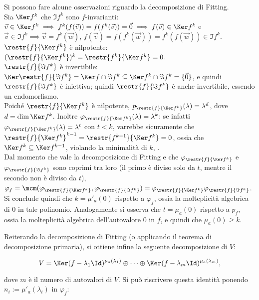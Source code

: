 \documentclass[11pt]{article}
\begin{document}
	\begin{remark} Si possono fare alcune osservazioni riguardo la decomposizione di Fitting. \\

	\li Sia $\Ker f^k$ che $\Im f^k$ sono $f$-invarianti: $\vec v \in \Ker f^k \implies f^k(f(\vec v)) = f(f^k(\vec v)) = \vec0 \implies f(\vec v) \in \Ker f^k$ e $\vec v \in \Im f^k \implies \vec v = f^k(\vec w)$, $f(\vec v) = f(f^k(\vec w)) = f^k(f(\vec w)) \in \Im f^k$. \\ 
	\li $\restr{f}{\Ker f^k}$ è nilpotente: $(\restr{f}{\Ker f^k})^k = \restr{f^k}{\Ker f^k} = 0$. \\
	\li $\restr{f}{\Im f^k}$ è invertibile: $\Ker \restr{f}{\Im f^k} = \Ker f \cap \Im f^k \subseteq \Ker f^k \cap \Im f^k = \{\vec 0\}$, e quindi $\restr{f}{\Im f^k}$ è iniettiva; quindi $\restr{f}{\Im f^k}$ è anche invertibile, essendo un endomorfismo. \\
	\li Poiché $\restr{f}{\Ker f^k}$ è nilpotente, $p_{\restr{f}{\Ker f^k}}(\lambda) = \lambda^d$, dove
	$d = \dim \Ker f^k$. Inoltre
	$\varphi_{\restr{f}{\Ker f^k}}(\lambda) = \lambda^k$: se infatti $\varphi_{\restr{f}{\Ker f^k}}(\lambda) = \lambda^t$
	con $t < k$, varrebbe sicuramente che ${\restr{f}{\Ker f^k}}^{k-1} = \restr{f^{k-1}}{\Ker f^k} = 0$, ossia che
	$\Ker f^k \subseteq \Ker f^{k-1}$, violando la minimalità di $k$, \Lightning. \\
	\li Dal momento che vale la decomposizione di Fitting e che $\varphi_{\restr{f}{\Ker f^k}}$ e $\varphi_{\restr{f}{\Im f^k}}$ sono coprimi tra loro (il primo è diviso solo da $t$, mentre il secondo non è diviso da $t$), $\varphi_f = \mcm(\varphi_{\restr{f}{\Ker f^k}}, \varphi_{\restr{f}{\Im f^k}}) = \varphi_{\restr{f}{\Ker f^k}} \varphi_{\restr{f}{\Im f^k}}$. Si conclude quindi che $k = \mu'_a(0)$ rispetto a $\varphi_f$, ossia la molteplicità algebrica di $0$ in
	tale polinomio. Analogamente si osserva che $t = \mu_a(0)$ rispetto a $p_f$, ossia la molteplicità algebrica
	dell'autovalore $0$ in $f$, e quindi che $\mu_a(0) \geq k$.
	\end{remark}
	
	Reiterando la decomposizione di Fitting (o applicando il teorema di decomposizione primaria), si ottiene
	infine la seguente decomposizione di $V$:
	
	\[ V = \Ker (f - \lambda_1 \Id)^{\mu_a(\lambda_1)} \oplus \cdots \oplus \Ker (f - \lambda_m \Id)^{\mu_a(\lambda_m)}, \]
	
	dove $m$ è il numero di autovalori di $V$. Si può riscrivere questa identità ponendo $n_i := \mu'_a(\lambda_i)$ in
	$\varphi_f$:
	
\end{document}
